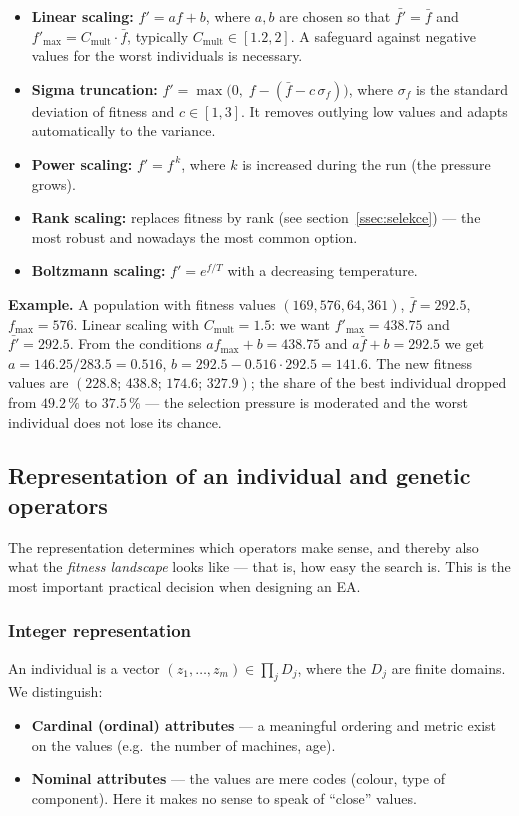 \documentclass[11pt,a4paper]{article}
\theoremstyle{definition}
\providecommand{\uv}[1]{``#1''}
\begin{document}
\begin{itemize}
\item \textbf{Linear scaling:} $f' = a f + b$, where $a, b$ are chosen so that
  $\bar{f'} = \bar{f}$ and $f'_{\max} = C_{\mathrm{mult}} \cdot \bar{f}$,
  typically $C_{\mathrm{mult}} \in [1.2, 2]$. A safeguard against negative
  values for the worst individuals is necessary.
\item \textbf{Sigma truncation:} $f' = \max\big(0,\; f - (\bar f - c\,\sigma_f)\big)$,
  where $\sigma_f$ is the standard deviation of fitness and $c \in [1,3]$. It
  removes outlying low values and adapts automatically to the variance.
\item \textbf{Power scaling:} $f' = f^{\,k}$, where $k$ is increased during the
  run (the pressure grows).
\item \textbf{Rank scaling:} replaces fitness by rank (see
  section~\ref{ssec:selekce}) --- the most robust and nowadays the most common
  option.
\item \textbf{Boltzmann scaling:} $f' = e^{f/T}$ with a decreasing temperature.
\end{itemize}

\textbf{Example.} A population with fitness values $(169, 576, 64, 361)$,
$\bar f = 292.5$, $f_{\max} = 576$. Linear scaling with
$C_{\mathrm{mult}} = 1.5$: we want $f'_{\max} = 438.75$ and $\bar{f'} = 292.5$.
From the conditions $a f_{\max} + b = 438.75$ and $a \bar f + b = 292.5$ we get
$a = 146.25/283.5 = 0.516$, $b = 292.5 - 0.516 \cdot 292.5 = 141.6$.
The new fitness values are $(228.8;\, 438.8;\, 174.6;\, 327.9)$; the share of
the best individual dropped from $49.2\,\%$ to $37.5\,\%$ --- the selection
pressure is moderated and the worst individual does not lose its chance.

\subsection{Representation of an individual and genetic operators}
\label{sec:reprez}
The representation determines which operators make sense, and thereby also what
the \emph{fitness landscape} looks like --- that is, how easy the search is.
This is the most important practical decision when designing an EA.

\subsubsection{Integer representation}

An individual is a vector $(z_1,\dots,z_m) \in \prod_j D_j$, where the $D_j$ are
finite domains. We distinguish:
\begin{itemize}
\item \textbf{Cardinal (ordinal) attributes} --- a meaningful ordering and
  metric exist on the values (e.g.\ the number of machines, age).
\item \textbf{Nominal attributes} --- the values are mere codes (colour, type of
  component). Here it makes no sense to speak of \uv{close} values.
\end{itemize}
\end{document}
